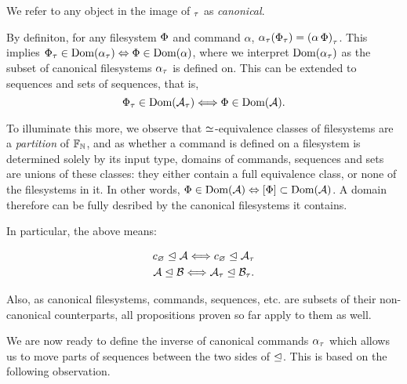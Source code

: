 We refer to any object in the image of ${}_\tau$ as \emph{canonical}.

By definiton, for any filesystem $\Phi$ and command $\alpha$, 
${\alpha}_\tau({\Phi}_\tau) = {(\alpha\,\Phi)}_\tau$.
This implies ${\Phi}_\tau\in\textrm{Dom}({{\alpha}_\tau}) \Leftrightarrow \Phi\in\textrm{Dom}({\alpha})$,
where we interpret $\textrm{Dom}({{\alpha}_\tau})$ as the subset of canonical filesystems ${\alpha}_\tau$ is defined on.
This can be extended to sequences and sets of sequences, that is,
\[ {\Phi}_\tau\in\textrm{Dom}({{\mathcal{A}}_\tau}) \Longleftrightarrow \Phi\in\textrm{Dom}({\mathcal{A}}). \]

To illuminate this more, we observe
that $\simeq$-equivalence classes of filesystems are a \emph{partition} of $\mathbb{F}_{\mathbb{N}}$,
and as whether a command is defined on a filesystem is determined solely by its input type,
domains of commands, sequences and sets are unions of these classes:
they either contain a full equivalence class, or none of the filesystems in it.
In other words, $\Phi\in\textrm{Dom}({\mathcal{A}}) \Leftrightarrow [\Phi] \subset \textrm{Dom}({\mathcal{A}})$.
A domain therefore can be fully desribed by the canonical filesystems it contains.

In particular, the above means:

\begin{myclm}
\begin{gather*}
{c_\varnothing}\trianglelefteq{\mathcal{A}} \Longleftrightarrow {c_\varnothing}\trianglelefteq{{\mathcal{A}}_\tau} \\
{\mathcal{A}}\trianglelefteq{\mathcal{B}} \Longleftrightarrow {{\mathcal{A}}_\tau}\trianglelefteq{{\mathcal{B}}_\tau}.
\end{gather*}
\end{myclm}



Also, as canonical filesystems, commands, sequences, etc.
are subsets of their non-canonical counterparts, 
all propositions proven so far apply to them as well.





\bigskip

\noindent We are now ready to define the inverse of canonical commands ${\alpha}_\tau$
which allows us to move parts of sequences between the
two sides of $\trianglelefteq$.
This is based on the following observation.

